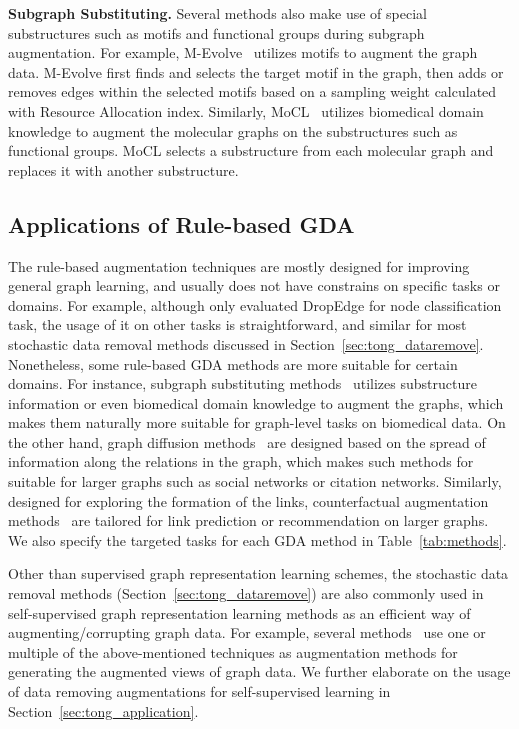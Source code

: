 \documentclass[11pt]{article}
\renewcommand\paragraph[1]{\vspace{0.05in} \noindent \textbf{#1.}}
\begin{document}
\paragraph{Subgraph Substituting}
Several methods also make use of special substructures such as motifs and functional groups during subgraph augmentation. For example,
M-Evolve~\cite{zhou2020data} utilizes motifs to augment the graph data. M-Evolve first finds and selects the target motif in the graph, then adds or removes edges within the selected motifs based on a sampling weight calculated with Resource Allocation index.
Similarly, MoCL~\cite{sun2021mocl} utilizes biomedical domain knowledge to augment the molecular graphs on the substructures such as functional groups. 
MoCL selects a substructure from each molecular graph and replaces it with another substructure. 


\subsection{Applications of Rule-based GDA}
The rule-based augmentation techniques are mostly designed for improving general graph learning, and usually does not have constrains on specific tasks or domains. For example, although \citet{rong2019dropedge} only evaluated DropEdge for node classification task, the usage of it on other tasks is straightforward, and similar for most stochastic data removal methods discussed in Section~\ref{sec:tong_dataremove}. Nonetheless, some rule-based GDA methods are more suitable for certain domains. For instance, subgraph substituting methods~\cite{zhou2020data,sun2021mocl} utilizes substructure information or even biomedical domain knowledge to augment the graphs, which makes them naturally more suitable for graph-level tasks on biomedical data. On the other hand, graph diffusion methods~\cite{klicpera2019diffusion} are designed based on the spread of information along the relations in the graph, which makes such methods for suitable for larger graphs such as social networks or citation networks. Similarly, designed for exploring the formation of the links, counterfactual augmentation methods~\cite{zhao2021counterfactual,zhu2022data} are tailored for link prediction or recommendation on larger graphs. We also specify the targeted tasks for each GDA method in Table~\ref{tab:methods}.

Other than supervised graph representation learning schemes, the stochastic data removal methods (Section~\ref{sec:tong_dataremove}) are also commonly used in self-supervised graph representation learning methods as an efficient way of augmenting/corrupting graph data. For example, several methods~\cite{velickovic2019deep,you2020graph,you2021graph,thakoor2022largescale} use one or multiple of the above-mentioned techniques as augmentation methods for generating the augmented views of graph data. We further elaborate on the usage of data removing augmentations for self-supervised learning in Section~\ref{sec:tong_application}.
\end{document}
